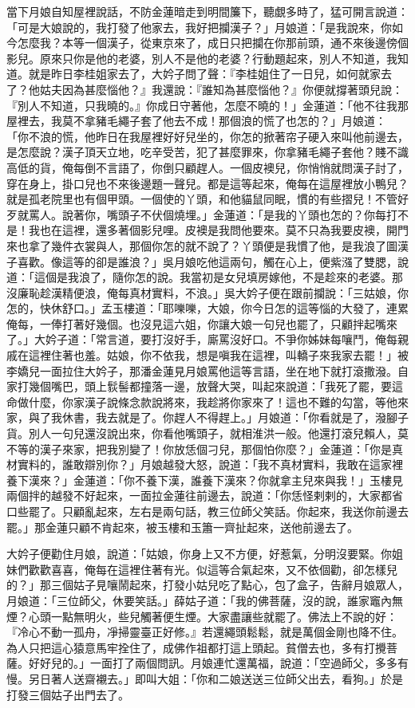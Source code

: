 當下月娘自知屋裡說話，不防金蓮暗走到明間簾下，聽覷多時了，猛可開言說道：「可是大娘說的，我打發了他家去，我好把攔漢子？」月娘道：「是我說來，你如今怎麼我？本等一個漢子，從東京來了，成日只把攔在你那前頭，通不來後邊傍個影兒。原來只你是他的老婆，別人不是他的老婆？行動題起來，別人不知道，我知道。就是昨日李桂姐家去了，大妗子問了聲：『李桂姐住了一日兒，如何就家去了？他姑夫因為甚麼惱他？』我還說：『誰知為甚麼惱他？』你便就撐著頭兒說： 『別人不知道，只我曉的。』你成日守著他，怎麼不曉的！」金蓮道：「他不往我那屋裡去，我莫不拿豬毛繩子套了他去不成！那個浪的慌了也怎的？」月娘道： 「你不浪的慌，他昨日在我屋裡好好兒坐的，你怎的掀著帘子硬入來叫他前邊去，是怎麼說？漢子頂天立地，吃辛受苦，犯了甚麼罪來，你拿豬毛繩子套他？賤不識高低的貨，俺每倒不言語了，你倒只顧趕人。一個皮襖兒，你悄悄就問漢子討了，穿在身上，掛口兒也不來後邊題一聲兒。都是這等起來，俺每在這屋裡放小鴨兒？就是孤老院里也有個甲頭。一個使的丫頭，和他貓鼠同眠，慣的有些摺兒！不管好歹就罵人。說著你，嘴頭子不伏個燒埋。」金蓮道：「是我的丫頭也怎的？你每打不是！我也在這裡，還多著個影兒哩。皮襖是我問他要來。莫不只為我要皮襖，開門來也拿了幾件衣裳與人，那個你怎的就不說了？丫頭便是我慣了他，是我浪了圖漢子喜歡。像這等的卻是誰浪？」吳月娘吃他這兩句，觸在心上，便紫漒了雙腮，說道：「這個是我浪了，隨你怎的說。我當初是女兒填房嫁他，不是趁來的老婆。那沒廉恥趁漢精便浪，俺每真材實料，不浪。」吳大妗子便在跟前攔說：「三姑娘，你怎的，快休舒口。」孟玉樓道：「耶嚛嚛，大娘，你今日怎的這等惱的大發了，連累俺每，一俸打著好幾個。也沒見這六姐，你讓大娘一句兒也罷了，只顧拌起嘴來了。」大妗子道：「常言道，要打沒好手，廝罵沒好口。不爭你姊妹每嚷鬥，俺每親戚在這裡住著也羞。姑娘，你不依我，想是嗔我在這裡，叫轎子來我家去罷！」被李嬌兒一面拉住大妗子，那潘金蓮見月娘罵他這等言語，坐在地下就打滾撒潑。自家打幾個嘴巴，頭上䯼髻都撞落一邊，放聲大哭，叫起來說道：「我死了罷，要這命做什麼，你家漢子說條念款說將來，我趁將你家來了！這也不難的勾當，等他來家，與了我休書，我去就是了。你趕人不得趕上。」月娘道：「你看就是了，潑腳子貨。別人一句兒還沒說出來，你看他嘴頭子，就相淮洪一般。他還打滾兒賴人，莫不等的漢子來家，把我別變了！你放恁個刁兒，那個怕你麼？」金蓮道：「你是真材實料的，誰敢辯別你？」月娘越發大怒，說道：「我不真材實料，我敢在這家裡養下漢來？」金蓮道：「你不養下漢，誰養下漢來？你就拿主兒來與我！」玉樓見兩個拌的越發不好起來，一面拉金蓮往前邊去，說道：「你恁怪剌剌的，大家都省口些罷了。只顧亂起來，左右是兩句話，教三位師父笑話。你起來，我送你前邊去罷。」那金蓮只顧不肯起來，被玉樓和玉簫一齊扯起來，送他前邊去了。

大妗子便勸住月娘，說道：「姑娘，你身上又不方便，好惹氣，分明沒要緊。你姐妹們歡歡喜喜，俺每在這裡住著有光。似這等合氣起來，又不依個勸，卻怎樣兒的？」那三個姑子見嚷鬧起來，打發小姑兒吃了點心，包了盒子，告辭月娘眾人，月娘道：「三位師父，休要笑話。」薛姑子道：「我的佛菩薩，沒的說，誰家竈內無煙？心頭一點無明火，些兒觸著便生煙。大家盡讓些就罷了。佛法上不說的好：『冷心不動一孤舟，凈掃靈臺正好修。』若還繩頭鬆鬆，就是萬個金剛也降不住。為人只把這心猿意馬牢拴住了，成佛作祖都打這上頭起。貧僧去也，多有打攪菩薩。好好兒的。」一面打了兩個問訊。月娘連忙還萬福，說道：「空過師父，多多有慢。另日著人送齋襯去。」即叫大姐：「你和二娘送送三位師父出去，看狗。」於是打發三個姑子出門去了。

